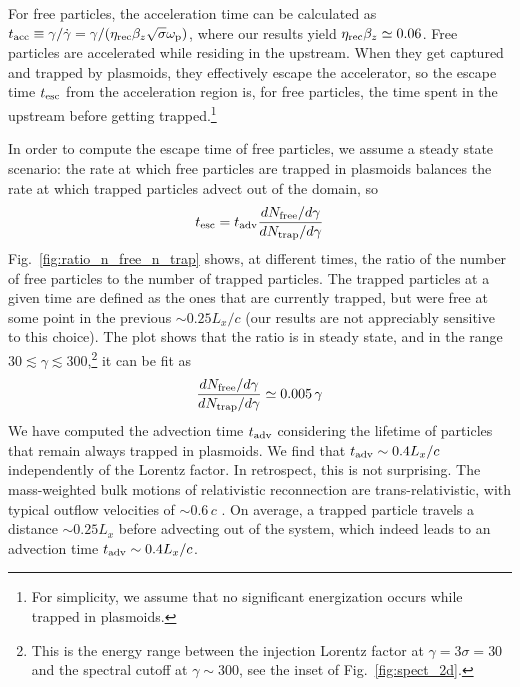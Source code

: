 \documentclass[twocolumn,twocolappendix]{aastex63}
\newcommand{\figg}[1]{Fig.~\ref{fig:#1}}
\newcommand{\ls}{\textcolor{teal}}
\newcommand{\omp}{\omega_{\rm p}}
\begin{document}
For free particles, the acceleration time can be calculated as $t_{\rm acc} \equiv \gamma/\dot{\gamma} = \gamma/(\eta_{\rm rec}\beta_z\sqrt{\sigma}\omp)$, where our results yield $\eta_{\rm rec}\beta_z\simeq 0.06$. Free particles are accelerated while residing in the upstream. When they get captured and trapped by plasmoids, they effectively escape the accelerator, so the escape time $t_{\rm esc}$ from the acceleration region is, for free particles, the time spent in the upstream before getting trapped.\footnote{For simplicity, we assume that no significant energization occurs while trapped in plasmoids.}

In order to compute the escape time of free particles, we assume a steady state scenario: the rate at which free particles are trapped in plasmoids balances the rate at which trapped particles advect out of the domain, so 
\begin{equation}\label{eq:eq1}
t_{\rm esc}=t_{\rm adv}\frac{dN_{\rm free}/d\gamma}{dN_{\rm trap}/d\gamma} 
\end{equation}
Fig.~\ref{fig:ratio_n_free_n_trap} shows, at different times, the ratio of the number of free particles to the number of trapped particles. The trapped particles at a given time are defined as the ones that are currently trapped, but were free at some point in the previous $\sim 0.25 L_x/c$ (our results are not appreciably sensitive to this choice). The plot shows that the ratio is in steady state, and in the range $30\lesssim\gamma\lesssim 300$,\footnote{This is the energy range between the injection Lorentz factor at $\gamma=3\sigma=30$ and the spectral cutoff at $\gamma\sim 300$, see the inset of \figg{spect_2d}.} it can be fit as 
\begin{equation}\label{eq:eq2}
\frac{dN_{\rm free}/d\gamma}{dN_{\rm trap}/d\gamma}\simeq 0.005\, \gamma
\end{equation}
We have computed the advection time $t_{\rm adv}$ considering the lifetime of particles that remain always trapped in plasmoids. We find that $t_{\rm adv}\sim 0.4 L_x/c$ independently of the Lorentz factor. In retrospect, this is not surprising. The mass-weighted bulk motions of relativistic reconnection are trans-relativistic, with typical outflow velocities of $\sim 0.6 \,c$ \citep{sironi_beloborodov_20}. On average, a trapped particle travels a distance $\sim 0.25 L_x$ before advecting out of the system, which indeed leads to an advection time $t_{\rm adv}\sim 0.4 L_x/c$.  
\end{document}
